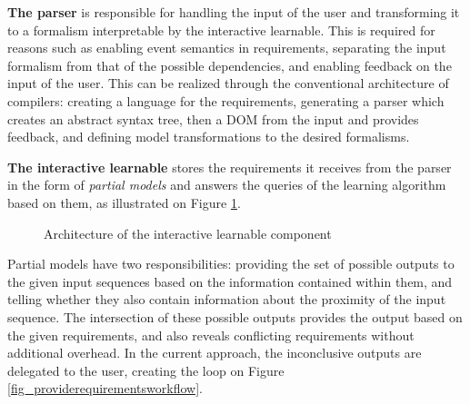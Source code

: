 \textbf{The parser} is responsible for handling the input of the user and transforming it to a formalism interpretable by the interactive learnable. This is required for reasons such as enabling event semantics in requirements, separating the input formalism from that of the possible dependencies, and enabling feedback on the input of the user. This can be realized through the conventional architecture of compilers: creating a language for the requirements, generating a parser which creates an abstract syntax tree, then a DOM from the input and provides feedback, and defining model transformations to the desired formalisms.

\textbf{The interactive learnable} stores the requirements it receives from the parser in the form of \textit{partial models} and answers the queries of the learning algorithm based on them, as illustrated on Figure \ref{fig_architcture_interactivelearnable}.

\begin{figure}[!ht] 
	\centering
	\caption{Architecture of the interactive learnable component} 
	\label{fig_architcture_interactivelearnable}
\end{figure}

Partial models have two responsibilities: providing the set of possible outputs to the given input sequences based on the information contained within them, and telling whether they also contain information about the proximity of the input sequence. The intersection of these possible outputs provides the output based on the given requirements, and also reveals conflicting requirements without additional overhead. In the current approach, the inconclusive outputs are delegated to the user, creating the loop on Figure \ref{fig_providerequirementsworkflow}.

